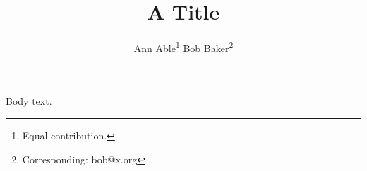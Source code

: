 \documentclass{article}
\title{A Title}
\author{Ann Able\thanks{Equal contribution.} \And Bob Baker\thanks{Corresponding: bob@x.org}}
\begin{document}
\maketitle
Body text.
\end{document}
